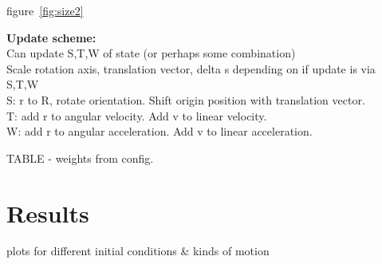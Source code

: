 			figure~\ref{fig:size2}
			
			
		\textbf{Update scheme:}\\
					
			Can update S,T,W of state (or perhaps some combination)\\
			Scale rotation axis, translation vector, delta s depending on if update is via S,T,W\\
			S: r to R, rotate orientation. Shift origin position with translation vector.\\
			T: add r to angular velocity. Add v to linear velocity.\\
			W: add r to angular acceleration. Add v to linear acceleration.

			TABLE - weights from config.
			
			
\section{Results}
plots for different initial conditions \& kinds of motion
	
